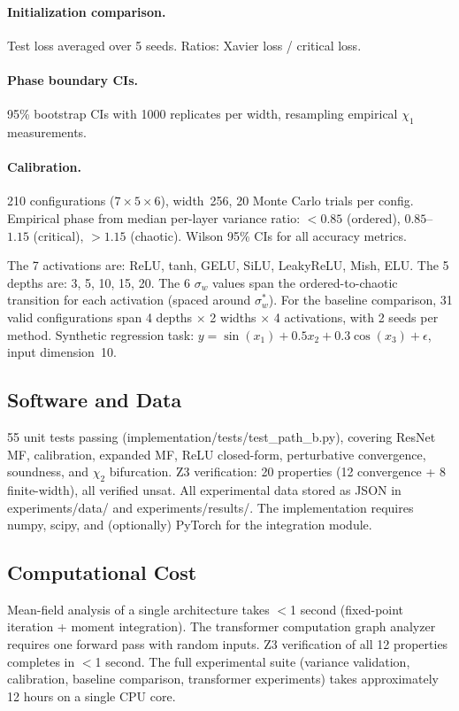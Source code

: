 \documentclass[10pt]{article}
\begin{document}
\paragraph{Initialization comparison.}
Test loss averaged over 5 seeds. Ratios: Xavier loss / critical loss.

\paragraph{Phase boundary CIs.}
95\% bootstrap CIs with 1000 replicates per width, resampling empirical $\chi_1$ measurements.

\paragraph{Calibration.}
210 configurations ($7 \times 5 \times 6$), width~256, 20 Monte Carlo trials per config.
Empirical phase from median per-layer variance ratio: $<0.85$ (ordered), $0.85$--$1.15$ (critical), $>1.15$ (chaotic).
Wilson 95\% CIs for all accuracy metrics.

The 7 activations are: ReLU, tanh, GELU, SiLU, LeakyReLU, Mish, ELU.
The 5 depths are: 3, 5, 10, 15, 20.
The 6 $\sigma_w$ values span the ordered-to-chaotic transition for each activation (spaced around $\sigma_w^*$).
For the baseline comparison, 31 valid configurations span 4 depths $\times$ 2 widths $\times$ 4 activations, with 2 seeds per method.
Synthetic regression task: $y = \sin(x_1) + 0.5x_2 + 0.3\cos(x_3) + \epsilon$, input dimension~10.

\subsection{Software and Data}

55 unit tests passing (implementation/tests/test\_path\_b.py), covering ResNet MF, calibration, expanded MF, ReLU closed-form, perturbative convergence, soundness, and $\chi_2$ bifurcation.
Z3 verification: 20 properties (12 convergence + 8 finite-width), all verified unsat.
All experimental data stored as JSON in experiments/data/ and experiments/results/.
The implementation requires numpy, scipy, and (optionally) PyTorch for the integration module.

\subsection{Computational Cost}

Mean-field analysis of a single architecture takes $<$1 second (fixed-point iteration + moment integration).
The transformer computation graph analyzer requires one forward pass with random inputs.
Z3 verification of all 12 properties completes in $<$1 second.
The full experimental suite (variance validation, calibration, baseline comparison, transformer experiments) takes approximately 12 hours on a single CPU core.
\end{document}
